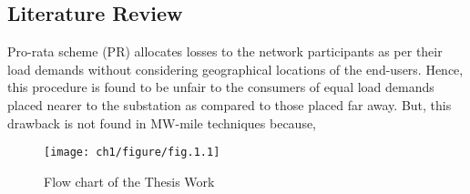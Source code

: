 \begin{spacing}{1.3}
\section{Literature Review}
Pro-rata scheme (PR) \cite{gonzalez1999spanish,ilic2013power} allocates losses to the network participants as per their load demands without considering geographical locations of the end-users. Hence, this procedure is found to be unfair to the consumers of equal load demands placed nearer to the substation as compared to those placed far away. But, this drawback is not found in MW-mile techniques \cite{pan2000review,shirmohammadi1989evaluation,shirmohammadi1991cost,shirmohammadi1996some,lima1996allocation} because, 
 
 
 \begin{figure}[H]
  	\centering
  	\texttt{[image: ch1/figure/fig.1.1]}\\
  	\caption{Flow chart of the Thesis Work}
  	\label{fig:fig.1.1}
  \end{figure}
 
 


\end{spacing}